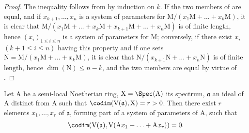 \begin{proof}
The inequality  follows from  by induction on $k$.
If the two members of  are equal, and if $x_{k+1},\ldots,x_n$ is a system of parameters for $\mathrm{M}/(x_1\mathrm{M}+\ldots+x_k\mathrm{M})$, it is clear that $\mathrm{M}/(x_1\mathrm{M}+\ldots+x_k\mathrm{M}+x_{k+1}\mathrm{M}+\ldots+x_n\mathrm{M})$ is of finite length, hence $(x_i)_{1\leq i\leq n}$ is a system of parameters for $\mathrm{M}$; conversely, if there exist $x_i$ $(k+1\leq i\leq n)$ having this property and if one sets $\mathrm{N}=\mathrm{M}/(x_1\mathrm{M}+\ldots+x_k\mathrm{M})$, it is clear that $\mathrm{N}/(x_{k+1}\mathrm{N}+\ldots+x_n\mathrm{N})$ is of finite length, hence $\dim(\mathrm{N})\leq n-k$, and the two members are equal by virtue of .
\end{proof}


\begin{proposition}[16.3.8]
\label{0.16.3.8}
Let $\mathrm{A}$ be a semi-local Noetherian ring, $\mathrm{X}=\Spec(\mathrm{A})$ its spectrum, $\mathfrak{a}$ an ideal of $\mathrm{A}$ distinct from $\mathrm{A}$ such that $\codim(\mathrm{V}(\mathfrak{a}),\mathrm{X})=r>0$.
Then there exist $r$ elements $x_1,\ldots,x_r$ of $\mathfrak{a}$, forming part of a system of parameters of $\mathrm{A}$, such that
\[
  \codim(\mathrm{V}(\mathfrak{a}),\mathrm{V}(\mathrm{A}x_1+\ldots+\mathrm{A}x_r))=0.
\]
\end{proposition}

